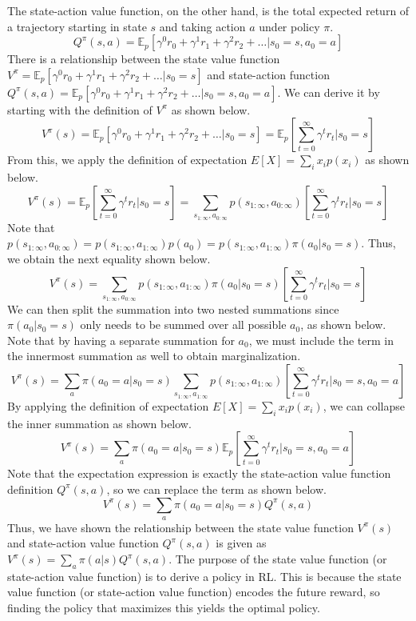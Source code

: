 \documentclass[11pt]{article}
\begin{document}
The state-action value function, on the other hand, is the total expected return of a trajectory starting in state $s$ and taking action $a$ under policy $\pi$.
\[ Q^\pi(s,a) = \mathds{E}_p [\gamma^0 r_0 + \gamma^1 r_1 + \gamma^2 r_2 + \dots | s_0 = s, a_0 = a] \]
There is a relationship between the state value function $
V^\pi = \mathds{E}_p [\gamma^0 r_0 + \gamma^1 r_1 + \gamma^2 r_2 + \dots | s_0 = s]$ and state-action function $Q^\pi(s,a) = \mathds{E}_p [\gamma^0 r_0 + \gamma^1 r_1 + \gamma^2 r_2 + \dots | s_0 = s, a_0 = a]$. We can derive it by starting with the definition of $V^\pi$ as shown below.
\[ V^\pi(s) = \mathds{E}_p [\gamma^0 r_0 + \gamma^1 r_1 + \gamma^2 r_2 + \dots | s_0 = s] = \mathds{E}_p \left[\sum_{t=0}^\infty \gamma^tr_t|s_0 = s \right] \]
From this, we apply the definition of expectation $E[X] = \sum_i x_ip(x_i)$ as shown below.
\[ V^\pi(s) = \mathds{E}_p \left[\sum_{t=0}^\infty \gamma^tr_t|s_0 = s \right] = \sum_{s_{1:\infty},a_{0:\infty}} p(s_{1:\infty},a_{0:\infty}) \left[\sum_{t=0}^\infty \gamma^tr_t|s_0 = s \right] \]
Note that $p(s_{1:\infty},a_{0:\infty}) = p(s_{1:\infty},a_{1:\infty})p(a_0) = p(s_{1:\infty},a_{1:\infty})\pi(a_0|s_0=s)$. Thus, we obtain the next equality shown below.
\[ V^\pi(s) = \sum_{s_{1:\infty},a_{0:\infty}} p(s_{1:\infty},a_{1:\infty})\pi(a_0|s_0=s) \left[\sum_{t=0}^\infty \gamma^tr_t|s_0 = s \right] \]
We can then split the summation into two nested summations since $\pi(a_0|s_0=s)$ only needs to be summed over all possible $a_0$, as shown below. Note that by having a separate summation for $a_0$, we must include the term in the innermost summation as well to obtain marginalization.
\[ V^\pi(s) = \sum_a\pi(a_0=a|s_0=s)\sum_{s_{1:\infty},a_{1:\infty}} p(s_{1:\infty},a_{1:\infty}) \left[\sum_{t=0}^\infty \gamma^tr_t|s_0 = s, a_0 = a \right] \]
By applying the definition of expectation $E[X] = \sum_i x_ip(x_i)$, we can collapse the inner summation as shown below.
\[ V^\pi(s) = \sum_a\pi(a_0=a|s_0=s) \mathds{E}_p \left[\sum_{t=0}^\infty \gamma^tr_t|s_0 = s, a_0 = a \right] \]
Note that the expectation expression is exactly the state-action value function definition $Q^\pi(s, a)$, so we can replace the term as shown below.
\[ V^\pi(s) = \sum_a\pi(a_0=a|s_0=s) Q^\pi(s, a) \]
Thus, we have shown the relationship between the state value function $V^\pi(s)$ and state-action value function $Q^\pi(s,a)$ is given as $V^\pi(s) = \sum_a\pi(a|s) Q^\pi(s, a)$.
The purpose of the state value function (or state-action value function) is to derive a policy in RL. This is because the state value function (or state-action value function) encodes the future reward, so finding the policy that maximizes this yields the optimal policy.
\end{document}
